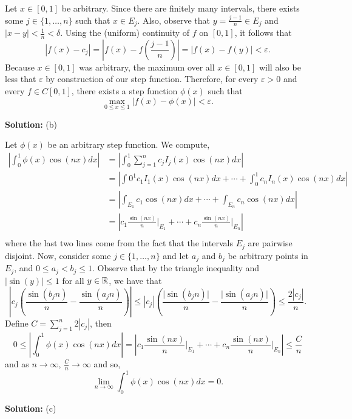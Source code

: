 \documentclass{article}
\begin{document}
Let $x\in [0,1]$ be arbitrary. Since there are finitely many intervals, there exists some $j\in\{1, \dots, n\}$ such that $x\in E_j$. Also, observe that $ y = \frac{j-1}{n} \in E_j$ and $|x-y| < \frac{1}{n} < \delta$. Using the (uniform) continuity of $f$ on $[0,1]$, it follows that 
	\[ |f(x) - c_j| = \left|f(x) - f\left(\frac{j-1}{n}\right)\right| = | f(x) - f(y) |  < \varepsilon. \]
Because $x\in [0,1]$ was arbitrary, the maximum over all $x\in [0,1]$ will also be less that $\varepsilon$ by construction of our step function. Therefore, for every $\varepsilon > 0$ and every $f\in C[0,1]$, there exists a step function $\phi(x)$ such that 
	\[ \max_{0\leq x\leq 1} \left| f(x) - \phi(x) \right| < \varepsilon.\]

\textbf{Solution:} (b)

Let $\phi(x)$ be an arbitrary step function. We compute, 
	\begin{align*}
		\left| \int_0^1 \phi(x) \cos(nx) dx \right| & = \left| \int_0^1 \sum_{j=1}^n c_j I_j(x) \cos(nx) dx \right| \\
									  & = \left| \int0^1 c_1 I_1(x) \cos(nx) dx + \cdots + \int_0^1 c_n I_n(x) \cos(nx) dx \right|\\
									  & = \left| \int_{E_1} c_1 \cos(nx) dx  + \cdots + \int_{E_n} c_n \cos(nx) dx \right|\\
									  & = \left| c_1 \frac{\sin(nx)}{n} \bigg\rvert_{E_1} + 
									  		\cdots + c_n \frac{\sin(nx)}{n} \bigg\rvert_{E_n} \right|\\
	\end{align*}
where the last two lines come from the fact that the intervals $E_j$ are pairwise disjoint. Now, consider some $j\in \{1, \dots, n\}$ and let $a_j$ and $b_j$ be arbitrary points in $E_j$, and $0 \leq a_j < b_j \leq 1$. Observe that by the triangle inequality and $|\sin(y)| \leq 1$ for all $y\in\mathbb R$, we have that 
	\[ \left| c_j \left( \frac{\sin(b_j n)}{n} - \frac{\sin(a_j n)}{n}\right)\right| \leq |c_j| \left( \frac{\big|\sin(b_j n)\big|}{n} - \frac{\big|\sin(a_j n)\big|}{n}\right) \leq \frac{2|c_j|}{n}.\]
Define $C = \sum_{j = 1}^n 2|c_j|$, then 
		\[ 0 \leq \left| \int_0^1 \phi(x) \cos(nx) dx \right| 
			= \left| c_1 \frac{\sin(nx)}{n} \bigg\rvert_{E_1} + \cdots + c_n \frac{\sin(nx)}{n} \bigg\rvert_{E_n} \right| 
			\leq \frac{C}{n} \]
and as $n\to\infty$, $\frac{C}{n}\to \infty$ and so, 
	\[ \lim_{n\to \infty} \int_0^1 \phi(x) \cos(nx) dx = 0.\]
	
\textbf{Solution:} (c)
\end{document}
